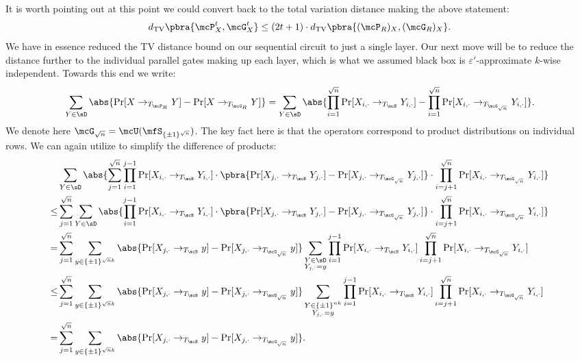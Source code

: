 It is worth pointing out at this point we could convert back to the total variation distance making the above statement:
\begin{equation*}
    d_{\textrm{TV}}\pbra{\mcP^t_X, \mcG^t_X} \leq (2t+1) \cdot d_{\textrm{TV}}\pbra{(\mcP_R)_X, (\mcG_R)_X}.
\end{equation*}
We have in essence reduced the TV distance bound on our sequential circuit to just a single layer. Our next move will be to reduce the distance further to the individual parallel gates making up each layer, which is what we assumed black box is $\varepsilon'$-approximate $k$-wise independent. Towards this end we write:
\begin{equation*}
    \sum_{Y \in \sD} \abs{\Pr[X \to_{T_{\mcP_R}} Y] - \Pr[X \to_{T_{\mcG_R}} Y]} = \sum_{Y \in \sD} \abs{\prod_{i=1}^{\sqrt{n}}\Pr[X_{i, \cdot} \to_{T_\mcB} Y_{i ,\cdot}] - \prod_{i=1}^{\sqrt{n}}\Pr[X_{i, \cdot} \to_{T_{\mcG_{\sqrt{n}}}} Y_{i ,\cdot}]}.
\end{equation*}
We denote here $\mcG_{\sqrt{n}} = \mcU(\mfS_{\{\pm1\}^{\sqrt{n}}})$. The key fact here is that the operators correspond to product distributions on individual rows. We can again utilize  to simplify the difference of products:
\begin{align*}
    &\sum_{Y \in \sD} \abs{\sum_{j = 1}^{\sqrt{n}} \prod_{i=1}^{j-1}\Pr[X_{i, \cdot} \to_{T_\mcB} Y_{i ,\cdot}] \cdot \pbra{\Pr[X_{j, \cdot} \to_{T_\mcB} Y_{j ,\cdot}] - \Pr[X_{j, \cdot} \to_{T_{\mcG_{\sqrt{n}}}} Y_{j ,\cdot}]} \cdot \prod_{i=j+1}^{\sqrt{n}}\Pr[X_{i, \cdot} \to_{T_{\mcG_{\sqrt{n}}}} Y_{i ,\cdot}]}\\
    \leq&  \sum_{j = 1}^{\sqrt{n}} \sum_{Y \in \sD} \abs{\prod_{i=1}^{j-1}\Pr[X_{i, \cdot} \to_{T_\mcB} Y_{i ,\cdot}] \cdot \pbra{\Pr[X_{j, \cdot} \to_{T_\mcB} Y_{j ,\cdot}] - \Pr[X_{j, \cdot} \to_{T_{\mcG_{\sqrt{n}}}} Y_{j ,\cdot}]} \cdot \prod_{i=j+1}^{\sqrt{n}}\Pr[X_{i, \cdot} \to_{T_{\mcG_{\sqrt{n}}}} Y_{i ,\cdot}]}\\
    =& \sum_{j = 1}^{\sqrt{n}} \sum_{y \in \{\pm1\}^{\sqrt{n}k}} \abs{\Pr[X_{j, \cdot} \to_{T_\mcB} y] - \Pr[X_{j, \cdot} \to_{T_{\mcG_{\sqrt{n}}}} y]} \sum_{\substack{Y \in \sD\\ Y_{j, \cdot} = y}} \prod_{i=1}^{j-1}\Pr[X_{i, \cdot} \to_{T_\mcB} Y_{i ,\cdot}] \prod_{i=j+1}^{\sqrt{n}}\Pr[X_{i, \cdot} \to_{T_{\mcG_{\sqrt{n}}}} Y_{i ,\cdot}]\\
    \leq& \sum_{j = 1}^{\sqrt{n}} \sum_{y \in \{\pm1\}^{\sqrt{n}k}} \abs{\Pr[X_{j, \cdot} \to_{T_\mcB} y] - \Pr[X_{j, \cdot} \to_{T_{\mcG_{\sqrt{n}}}} y]} \sum_{\substack{Y \in \{\pm1\}^{nk}\\ Y_{j, \cdot} = y}} \prod_{i=1}^{j-1}\Pr[X_{i, \cdot} \to_{T_\mcB} Y_{i ,\cdot}] \prod_{i=j+1}^{\sqrt{n}}\Pr[X_{i, \cdot} \to_{T_{\mcG_{\sqrt{n}}}} Y_{i ,\cdot}]\\
    =& \sum_{j = 1}^{\sqrt{n}} \sum_{y \in \{\pm1\}^{\sqrt{n}k}} \abs{\Pr[X_{j, \cdot} \to_{T_\mcB} y] - \Pr[X_{j, \cdot} \to_{T_{\mcG_{\sqrt{n}}}} y]}.
\end{align*}
